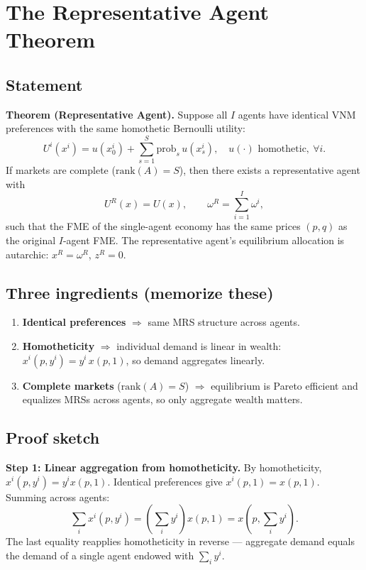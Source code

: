 \section{The Representative Agent Theorem}

\subsection*{Statement}

\begin{tcolorbox}
\textbf{Theorem (Representative Agent).} Suppose all $I$ agents have identical VNM preferences with the same homothetic Bernoulli utility:
\[
U^i(x^i) = u(x_0^i) + \sum_{s=1}^S \mathrm{prob}_s\, u(x_s^i), \quad u(\cdot) \text{ homothetic}, \ \forall i.
\]
If markets are complete ($\mathrm{rank}(A) = S$), then there exists a representative agent with
\[
U^R(x) = U(x), \qquad \omega^R = \sum_{i=1}^I \omega^i,
\]
such that the FME of the single-agent economy has the same prices $(p,q)$ as the original $I$-agent FME. The representative agent's equilibrium allocation is autarchic: $x^R = \omega^R$, $z^R = 0$.
\end{tcolorbox}

\subsection*{Three ingredients (memorize these)}

\begin{enumerate}
    \item \textbf{Identical preferences} $\Rightarrow$ same MRS structure across agents.
    \item \textbf{Homotheticity} $\Rightarrow$ individual demand is linear in wealth: $x^i(p, y^i) = y^i \, x(p, 1)$, so demand aggregates linearly.
    \item \textbf{Complete markets} ($\mathrm{rank}(A) = S$) $\Rightarrow$ equilibrium is Pareto efficient and equalizes MRSs across agents, so only aggregate wealth matters.
\end{enumerate}

\subsection*{Proof sketch}

\textbf{Step 1: Linear aggregation from homotheticity.} By homotheticity, $x^i(p, y^i) = y^i x(p,1)$. Identical preferences give $x^i(p,1) = x(p,1)$. Summing across agents:
\[
\sum_i x^i(p, y^i) = \left(\sum_i y^i\right) x(p,1) = x\!\left(p, \sum_i y^i\right).
\]
The last equality reapplies homotheticity in reverse — aggregate demand equals the demand of a single agent endowed with $\sum_i y^i$.

